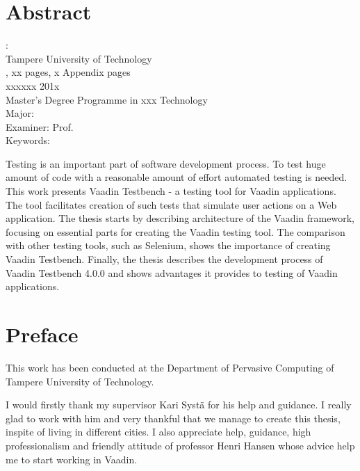 \documentclass[12pt,a4paper,english%
]{tutthesis}
\begin{document}
\chapter*{Abstract}
\begin{spacing}{1.0}
         {\bf \textsf{\MakeUppercase{\@author}}}: \@title\\   %
         \textsf{Tampere University of Technology}\\
         \textsf{\@thesistype, xx pages, x Appendix pages} \\
         \textsf{xxxxxx 201x}\\
         \textsf{Master's Degree Programme in xxx Technology}\\
         \textsf{Major: }\\
         \textsf{Examiner: Prof. \@examiner}\\ %
         \textsf{Keywords: }\\
\end{spacing}

Testing is an important part of software development process.
To test huge amount of code with a reasonable amount of effort automated testing is needed. 
This work presents Vaadin Testbench - a testing tool for Vaadin applications.
The tool facilitates creation of such tests that simulate user actions on a Web application.
The thesis starts by  describing architecture of the Vaadin framework, focusing
on essential parts for creating the Vaadin testing tool. The comparison with other testing tools, such as Selenium,
 shows the importance of creating Vaadin Testbench.
  Finally, the thesis describes the development process of Vaadin Testbench
  4.0.0 and shows advantages it provides to testing of Vaadin applications.

\makeatother %
\chapter*{Preface}
This work has been conducted at the Department of Pervasive Computing of Tampere 
University of Technology.

I would firstly thank my supervisor Kari Syst{\"a} for his help and guidance. I
really glad to work with him and very thankful that we manage to create this
thesis, inspite of living in different cities. I also appreciate help,
guidance, high professionalism and friendly attitude of professor Henri Hansen 
whose advice help me to start working in Vaadin.	
\end{document}
